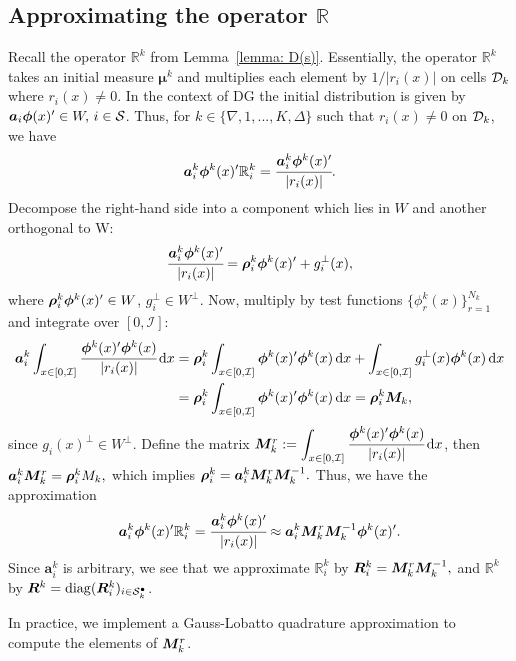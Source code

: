 \subsection{Approximating the operator \(\mathbb R\)}\label{sec: approx r}
Recall the operator \(\mathbb R^k\) from Lemma~\ref{lemma: D(s)}. Essentially, the operator \(\mathbb R^k\) takes an initial measure \(\boldsymbol \mu^k\) and multiplies each element by \(1/|r_i(x)|\) on cells \(\mathcal{D}_k\) where \(r_i(x)\neq 0\). In the context of DG the initial distribution is given by \(\boldsymbol a_i \boldsymbol \phi(x)'{}\in W,\,i\in\mathcal{S}\). Thus, for \(k\in\{\nabla,1,...,K,\Delta\}\) such that \(r_i(x)\neq0\) on \(\mathcal{D}_k\), we have 
\[\boldsymbol a_i^k \boldsymbol \phi^k(x)'{}\mathbb R^k_i = \cfrac{\boldsymbol a_i^k \boldsymbol \phi^k(x)'{}}{|r_i(x)|}.\]
Decompose the right-hand side into a component which lies in \(W\) and another orthogonal to W: 
\[\cfrac{\boldsymbol a_i^k \boldsymbol \phi^k(x)'{}}{|r_i(x)|} = \boldsymbol \rho^k_i \boldsymbol \phi^k(x)'{} + g_i^\perp(x),\] where \(\boldsymbol \rho^k_i \boldsymbol\phi^k(x)'{}\in W\), \(g_i^\perp \in W^\perp\). Now, multiply by test functions \(\{\phi_r^k(x)\}_{r=1}^{N_k}\) and integrate over \([0,\mathcal I]\):
\begin{align*}
	\boldsymbol a_i^k\int_{x\in[0,\mathcal I]} \cfrac{ \boldsymbol \phi^k(x)'{}\boldsymbol \phi^k(x)}{|r_i(x)|}\, \mathrm{d} x
	&=\boldsymbol \rho^k_i \int_{x\in[0,\mathcal I]}\boldsymbol \phi^k(x)'{}\boldsymbol \phi^k(x)\, \mathrm{d} x + \int_{x\in[0,\mathcal I]} g_i^\perp(x)\boldsymbol\phi^k(x)\, \mathrm{d} x 
	\\&= \boldsymbol \rho^k_i \int_{x\in[0,\mathcal I]}\boldsymbol \phi^k(x)'{}\boldsymbol \phi^k(x)\, \mathrm{d} x = \boldsymbol \rho_i^k\boldsymbol M_k,
\end{align*}
since \(g_i(x)^\perp\in W^\perp\). Define the matrix \(\boldsymbol M_k^r := \displaystyle\int_{x\in[0,\mathcal I]} \cfrac{ \boldsymbol \phi^k(x)'{}\boldsymbol \phi^k(x)}{|r_i(x)|}\, \mathrm{d} x\), then 
\(
	\boldsymbol a_i^k\boldsymbol M_k^r
	= \boldsymbol \rho^k_i M_k,
\)
which implies
\(
	\boldsymbol \rho^k_i  = \boldsymbol a_i^k\boldsymbol M_k^r\boldsymbol M_k^{-1}.
\)
Thus, we have the approximation 
\[\boldsymbol a_i^k \boldsymbol \phi^k(x)'{}\mathbb R^k_i = \cfrac{\boldsymbol a_i^k \boldsymbol \phi^k(x)'{}}{|r_i(x)|}\approx \boldsymbol a_i^k\boldsymbol M_k^r\boldsymbol M_k^{-1}\boldsymbol\phi^k(x)'{}.\]
Since \(\boldsymbol a_i^k\) is arbitrary, we see that we approximate \(\mathbb R_i^k\) by \(  \boldsymbol R_i^k = \boldsymbol M_k^r\boldsymbol M_k^{-1},\)
and \(\mathbb R^k\) by \(  \boldsymbol R^k = \mathrm{diag}(  \boldsymbol R_i^k)_{i\in\mathcal{S}^\bullet_k}\).

In practice, we implement a Gauss-Lobatto quadrature approximation to compute the elements of \(\boldsymbol M_k^r\).

